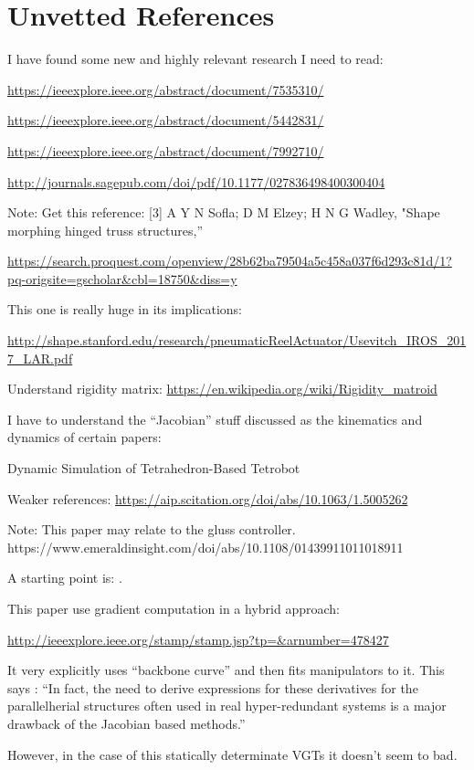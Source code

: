 \documentclass[11pt]{article}
\begin{document}
\section{Unvetted References}

I have found some new and highly relevant research I need to read:

\url{https://ieeexplore.ieee.org/abstract/document/7535310/}

\url{https://ieeexplore.ieee.org/abstract/document/5442831/}

\url{https://ieeexplore.ieee.org/abstract/document/7992710/}

\url{http://journals.sagepub.com/doi/pdf/10.1177/027836498400300404}

Note: Get this reference: [3] A Y N Sofla; D M Elzey; H N G Wadley, "Shape morphing hinged truss structures,''


\url{https://search.proquest.com/openview/28b62ba79504a5c458a037f6d293c81d/1?pq-origsite=gscholar&cbl=18750&diss=y}

This one is really huge in its implications:

\url{http://shape.stanford.edu/research/pneumaticReelActuator/Usevitch_IROS_2017_LAR.pdf}

Understand rigidity matrix: \url{https://en.wikipedia.org/wiki/Rigidity_matroid}


I have to understand the ``Jacobian'' stuff discussed as the kinematics and dynamics of certain papers:

Dynamic Simulation of Tetrahedron-Based Tetrobot


Weaker references: \url{https://aip.scitation.org/doi/abs/10.1063/1.5005262}



Note: This paper may relate to the gluss controller. https://www.emeraldinsight.com/doi/abs/10.1108/01439911011018911


A starting point is: \cite{Hanahara2008}.

This paper use gradient computation in a hybrid approach:

\url{http://ieeexplore.ieee.org/stamp/stamp.jsp?tp=&arnumber=478427}

It very explicitly uses ``backbone curve'' and then fits manipulators to it.
This says :  ``In fact, the need to derive expressions for these
derivatives for the parallelherial structures often used in real
hyper-redundant systems is a major drawback of the Jacobian
based methods.''

However, in the case of this statically determinate VGTs it doesn't seem to bad.
\end{document}
